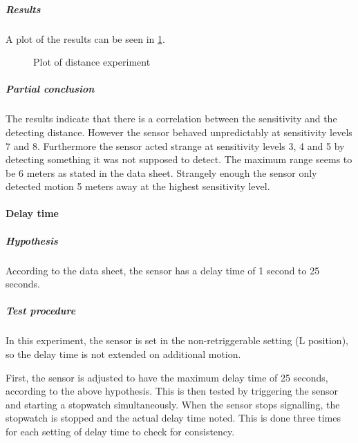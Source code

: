 \subparagraph{Results}

A plot of the results can be seen in \cref{fig:pir_distance}.

\begin{figure}[htbp]
\centering
{}
\caption[Distance experiment]{Plot of distance experiment}\label{fig:pir_distance}
\end{figure}

\subparagraph{Partial conclusion}
The results indicate that there is a correlation between the sensitivity and the detecting distance.
However the sensor behaved unpredictably at sensitivity levels 7 and 8.
Furthermore the sensor acted strange at sensitivity levels 3, 4 and 5 by detecting something it was not supposed to detect.
The maximum range seems to be 6 meters as stated in the data sheet.
Strangely enough the sensor only detected motion 5 meters away at the highest
sensitivity level.

\paragraph{Delay time}

\subparagraph{Hypothesis}

According to the data sheet, the sensor has a delay time of 1 second to 25 seconds.

\subparagraph{Test procedure}

In this experiment, the sensor is set in the non-retriggerable setting (L
position), so the delay time is not extended on additional motion.

First, the sensor is adjusted to have the maximum delay time of 25 seconds,
according to the above hypothesis. This is then tested by triggering the sensor
and starting a stopwatch simultaneously. When the sensor stops signalling, the
stopwatch is stopped and the actual delay time noted. This is done three times
for each setting of delay time to check for consistency.

